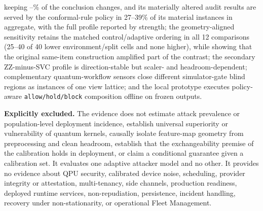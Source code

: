 \documentclass[10pt,journal,compsoc]{IEEEtran}
\begin{document}
{keeping \AdvMatRetentionMinPct--\AdvMatRetentionMaxPct\% of the conclusion changes, and its materially
altered audit results are served by the conformal-rule policy in 27--39\% of its
material instances in aggregate, with the full profile reported by strength;
the geometry-aligned sensitivity retains the matched control/adaptive ordering
in all 12 comparisons (25--40 of 40 lower environment/split cells and none
higher), while showing that the original same-item construction amplified part
of the contrast;
the secondary ZZ-minus-SVC
profile is direction-stable but scaler- and headroom-dependent; complementary
quantum-workflow sensors close different simulator-gate blind regions as
instances of one view lattice; and the local prototype executes policy-aware
\texttt{allow/hold/block} composition offline on frozen outputs.\par}

\textbf{Explicitly excluded.} The evidence does not estimate attack
prevalence or population-level deployment incidence, establish universal
superiority or vulnerability of quantum kernels, causally isolate feature-map
geometry from preprocessing and clean headroom, establish that the
exchangeability premise of the calibration holds in deployment, or claim a
conditional guarantee given a calibration set. It evaluates one adaptive
attacker model and no other. It provides no evidence about QPU security,
calibrated device noise, scheduling, provider integrity or attestation,
multi-tenancy, side channels, production readiness, deployed runtime
services, non-repudiation, persistence, incident handling, recovery under
non-stationarity, or operational Fleet Management.
\end{document}
